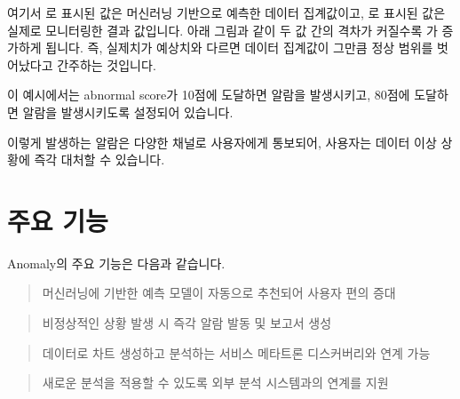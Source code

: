 \documentclass[letterpaper,10pt,english]{sphinxmanual}
\begin{document}
여기서 로 표시된 값은 머신러닝 기반으로 예측한 데이터 집계값이고, 로 표시된 값은 실제로 모니터링한 결과 값입니다. 아래 그림과 같이 두 값 간의 격차가 커질수록 가 증가하게 됩니다. 즉, 실제치가 예상치와 다르면 데이터 집계값이 그만큼 정상 범위를 벗어났다고 간주하는 것입니다.
\begin{quote}

\begin{figure}[H]
\centering

\noindent{}
\end{figure}
\end{quote}

이 예시에서는 abnormal score가 10점에 도달하면  알람을 발생시키고, 80점에 도달하면  알람을 발생시키도록 설정되어 있습니다.

이렇게 발생하는 알람은 다양한 채널로 사용자에게 통보되어, 사용자는 데이터 이상 상황에 즉각 대처할 수 있습니다.


\section{주요 기능}
\label{\detokenize{anomaly/part01/index:id2}}
Anomaly의 주요 기능은 다음과 같습니다.

\begin{quote}

머신러닝에 기반한 예측 모델이 자동으로 추천되어 사용자 편의 증대
\end{quote}

\begin{quote}

비정상적인 상황 발생 시 즉각 알람 발동 및 보고서 생성
\end{quote}

\begin{quote}

데이터로 차트 생성하고 분석하는 서비스 메타트론 디스커버리와 연계 가능
\end{quote}

\begin{quote}

새로운 분석을 적용할 수 있도록 외부 분석 시스템과의 연계를 지원
\end{quote}
\end{document}
